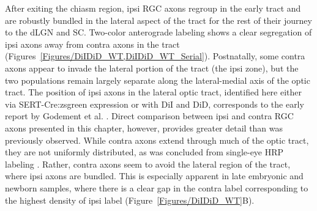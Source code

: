 After exiting the chiasm region, ipsi RGC axons regroup in the early tract and are robustly bundled in the lateral aspect of the tract for the rest of their journey to the dLGN and SC.
Two-color anterograde labeling shows a clear segregation of ipsi axons away from contra axons in the tract (Figures~\ref{Figures/DiIDiD_WT,DiIDiD_WT_Serial}).
Postnatally, some contra axons appear to invade the lateral portion of the tract (the ipsi zone), but the two populations remain largely separate along the lateral-medial axis of the optic tract.
The position of ipsi axons in the lateral optic tract, identified here either via SERT-Cre:zsgreen expression or with DiI and DiD, corresponds to the early report by Godement et al. .
Direct comparison between ipsi and contra RGC axons presented in this chapter, however, provides greater detail than was previously observed.
While contra axons extend through much of the optic tract, they are not uniformly distributed, as was concluded from single-eye HRP labeling \cite{godement1984prenatal}.
Rather, contra axons seem to avoid the lateral region of the tract, where ipsi axons are bundled.
This is especially apparent in late embryonic and newborn samples, where there is a clear gap in the contra label corresponding to the highest density of ipsi label (Figure~\ref{Figures/DiIDiD_WT}B). 

